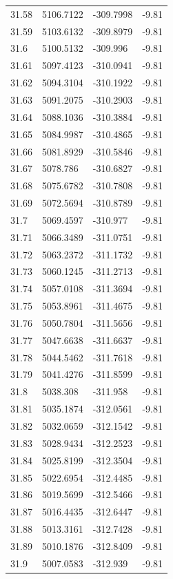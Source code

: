 \begin{table}[H]
\begin{tabular}{llll}
31.58 & 5106.7122 & -309.7998 & -9.81 \\
31.59 & 5103.6132 & -309.8979 & -9.81 \\
31.6 & 5100.5132 & -309.996 & -9.81 \\
31.61 & 5097.4123 & -310.0941 & -9.81 \\
31.62 & 5094.3104 & -310.1922 & -9.81 \\
31.63 & 5091.2075 & -310.2903 & -9.81 \\
31.64 & 5088.1036 & -310.3884 & -9.81 \\
31.65 & 5084.9987 & -310.4865 & -9.81 \\
31.66 & 5081.8929 & -310.5846 & -9.81 \\
31.67 & 5078.786 & -310.6827 & -9.81 \\
31.68 & 5075.6782 & -310.7808 & -9.81 \\
31.69 & 5072.5694 & -310.8789 & -9.81 \\
31.7 & 5069.4597 & -310.977 & -9.81 \\
31.71 & 5066.3489 & -311.0751 & -9.81 \\
31.72 & 5063.2372 & -311.1732 & -9.81 \\
31.73 & 5060.1245 & -311.2713 & -9.81 \\
31.74 & 5057.0108 & -311.3694 & -9.81 \\
31.75 & 5053.8961 & -311.4675 & -9.81 \\
31.76 & 5050.7804 & -311.5656 & -9.81 \\
31.77 & 5047.6638 & -311.6637 & -9.81 \\
31.78 & 5044.5462 & -311.7618 & -9.81 \\
31.79 & 5041.4276 & -311.8599 & -9.81 \\
31.8 & 5038.308 & -311.958 & -9.81 \\
31.81 & 5035.1874 & -312.0561 & -9.81 \\
31.82 & 5032.0659 & -312.1542 & -9.81 \\
31.83 & 5028.9434 & -312.2523 & -9.81 \\
31.84 & 5025.8199 & -312.3504 & -9.81 \\
31.85 & 5022.6954 & -312.4485 & -9.81 \\
31.86 & 5019.5699 & -312.5466 & -9.81 \\
31.87 & 5016.4435 & -312.6447 & -9.81 \\
31.88 & 5013.3161 & -312.7428 & -9.81 \\
31.89 & 5010.1876 & -312.8409 & -9.81 \\
31.9 & 5007.0583 & -312.939 & -9.81 \\

\end{tabular}
\end{table}
